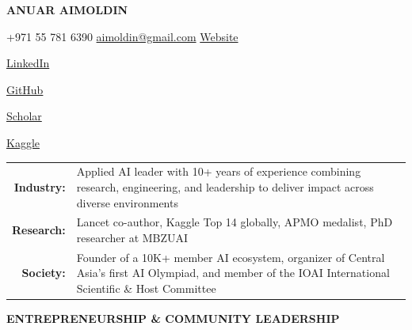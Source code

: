 \documentclass[11pt,a4paper]{article}
\newcommand{\sectionletterspacing}[1]{{\addfontfeatures{LetterSpace=14}#1}}
\newcommand{\BodyFont}{\fontsize{11}{13.75}\selectfont}
\newcommand{\HeaderContactFont}{\contactfont\fontsize{9.5}{11.4}\selectfont}
\newcommand{\HeaderPlainFont}{\contactfont\fontsize{9.0}{10.8}\selectfont}
\newcommand{\SectionFont}{\fontsize{15.2}{18.8}\selectfont}
\newcommand{\NameFont}{\fontsize{24.8}{28.3}\selectfont}
\newcommand{\headersep}{\textcolor{secondary}{\enspace\textbullet\enspace}}
\newcommand{\headerplain}[1]{{\HeaderPlainFont\textcolor{textgray}{#1}}}
\newcommand{\contactlink}[2]{%
  \href{#2}{\textcolor{secondary}{#1}}%
}
\newcommand{\sectiontitle}[1]{%
  \vspace{0.64em}
  {\centering\SectionFont\bfseries\textcolor{accent}{\sectionletterspacing{#1}}\par}
  \vspace{0.28em}
}
\begin{document}
\BodyFont

\begin{center}
{\NameFont\bfseries{} ANUAR AIMOLDIN\par}
\vspace{0.55em}
{%
  \HeaderContactFont
  \headerplain{+971 55 781 6390}
  \headersep
  \href{mailto:aimoldin@gmail.com}{\textcolor{secondary}{aimoldin@gmail.com}}
  \headersep
  \contactlink{Website}{https://anuar.best/}
  \headersep
  \contactlink{LinkedIn}{https://www.linkedin.com/in/anuar-aimoldin/}
  \headersep
  \contactlink{GitHub}{https://github.com/sneddy}
  \headersep
  \contactlink{Scholar}{https://scholar.google.com/citations?user=SE9vprcAAAAJ&hl=en}
  \headersep
  \contactlink{Kaggle}{http://kaggle.com/sneddy}\par
}
\end{center}

\newcommand{\SummaryFont}{\fontsize{13.5}{16.5}\selectfont}
\newcommand{\summarylabel}[1]{\textcolor{accent}{\textbf{#1:}}}

\begin{center}
\begin{minipage}{0.95\textwidth}
{\SummaryFont
\begin{tabularx}{\linewidth}{@{}r@{\hspace{0.70em}}X@{}}
\summarylabel{Industry} & Applied AI leader with 10+ years of experience combining research, engineering, and leadership to deliver impact across diverse environments \\
\summarylabel{Research} & Lancet co-author, Kaggle Top 14 globally, APMO medalist, PhD researcher at MBZUAI \\
\summarylabel{Society} & Founder of a 10K+ member AI ecosystem, organizer of Central Asia’s first AI Olympiad, and member of the IOAI International Scientific \& Host Committee \\
\end{tabularx}\par
}
\end{minipage}
\end{center}

\sectiontitle{ENTREPRENEURSHIP \& COMMUNITY LEADERSHIP}
\end{document}
